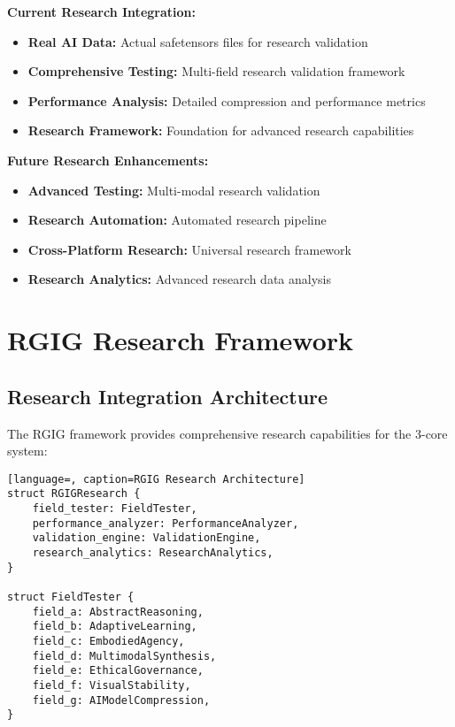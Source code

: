 \documentclass[12pt,a4paper]{article}
\begin{document}
\textbf{Current Research Integration:}
\begin{itemize}
    \item \textbf{Real AI Data:} Actual safetensors files for research validation
    \item \textbf{Comprehensive Testing:} Multi-field research validation framework
    \item \textbf{Performance Analysis:} Detailed compression and performance metrics
    \item \textbf{Research Framework:} Foundation for advanced research capabilities
\end{itemize}

\textbf{Future Research Enhancements:}
\begin{itemize}
    \item \textbf{Advanced Testing:} Multi-modal research validation
    \item \textbf{Research Automation:} Automated research pipeline
    \item \textbf{Cross-Platform Research:} Universal research framework
    \item \textbf{Research Analytics:} Advanced research data analysis
\end{itemize}

\section{RGIG Research Framework}

\subsection{Research Integration Architecture}

The RGIG framework provides comprehensive research capabilities for the 3-core system:

\begin{lstlisting}[language=, caption=RGIG Research Architecture]
struct RGIGResearch {
    field_tester: FieldTester,
    performance_analyzer: PerformanceAnalyzer,
    validation_engine: ValidationEngine,
    research_analytics: ResearchAnalytics,
}

struct FieldTester {
    field_a: AbstractReasoning,
    field_b: AdaptiveLearning,
    field_c: EmbodiedAgency,
    field_d: MultimodalSynthesis,
    field_e: EthicalGovernance,
    field_f: VisualStability,
    field_g: AIModelCompression,
}
\end{lstlisting}
\end{document}
